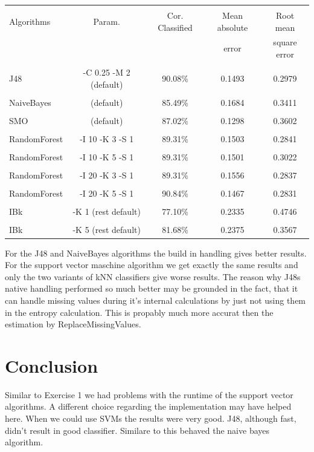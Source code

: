 \documentclass[a4paper]{article}
\begin{document}
\begin{table}
\begin{tabular}{|l| c | c | c | c |}
\hline & & & & \\
Algorithms & Param. & Cor. Classified & Mean absolute & Root mean \\
& & & error & square error\\
\hline & & & & \\
J48 &-C 0.25 -M 2 (default) & 90.08\% & 0.1493 & 0.2979 \\
\hline & & & & \\
NaiveBayes & (default) & 85.49\% & 0.1684 & 0.3411 \\
\hline & & & & \\
   SMO & (default) & 87.02\% & 0.1298 & 0.3602 \\
\hline & & & & \\
RandomForest & -I 10 -K 3 -S 1 & 89.31\% & 0.1503 & 0.2841 \\
\hline & & & & \\
RandomForest & -I 10 -K 5 -S 1 & 89.31\% & 0.1501 & 0.3022 \\
\hline & & & & \\
RandomForest & -I 20 -K 3 -S 1 & 89.31\% & 0.1556 & 0.2837 \\
\hline & & & & \\
RandomForest & -I 20 -K 5 -S 1 & 90.84\% & 0.1467 & 0.2831 \\
\hline & & & & \\
IBk          & -K 1 (rest default) & 77.10\% & 0.2335 & 0.4746 \\
\hline & & & & \\
IBk          & -K 5 (rest default) & 81.68\% & 0.2375 & 0.3567 \\
\hline 
\end{tabular}
\end{table}

For the J48 and NaiveBayes algorithms the build in handling gives better
results. For the support vector maschine algorithm we get exactly the same
results and only the two variants of kNN classifiers give worse results.
The reason why J48s native handling performed so much better may be grounded in
the fact, that it can handle missing values during it's internal calculations by
just not using them in the entropy calculation. This is propably much more
accurat then the estimation by ReplaceMissingValues.

\section{Conclusion}
Similar to Exercise 1 we had problems with the runtime of the support vector
algorithms. A different choice regarding the implementation may have helped
here. When we could use SVMs the results were very good. J48, although fast,
didn't result in good classifier. Similare to this behaved the naive bayes
algorithm.
\end{document}
